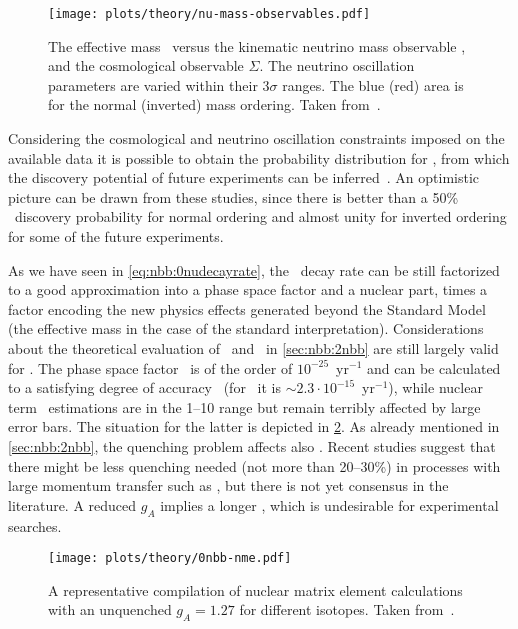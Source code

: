 \begin{figure}
  \centering
  \texttt{[image: plots/theory/nu-mass-observables.pdf]}
  \caption{%
    The effective mass \mbb\ versus the kinematic neutrino mass observable
    \mb, and the cosmological observable $\Sigma$. The neutrino
    oscillation parameters are varied within their $3\sigma$ ranges. The blue
    (red) area is for the normal (inverted) mass ordering. Taken
    from~\cite{Dolinski2019}.
  }\label{fig:nbb:mass-obs}
\end{figure}

Considering the cosmological and neutrino oscillation constraints imposed
on the available data it is possible to obtain the probability distribution
for \mbb, from which the discovery potential of future experiments can be
inferred~\cite{Caldwell2017, Agostini2017a, Ge2017}. An optimistic picture can
be drawn from these studies, since there is better than a 50\% \onbb\ discovery
probability for normal ordering and almost unity for inverted ordering for some
of the future experiments.

As we have seen in \cref{eq:nbb:0nudecayrate}, the \onbb\ decay rate can be
still factorized to a good approximation into a phase space factor and a
nuclear part, times a factor encoding the new physics effects generated beyond
the Standard Model (the effective mass in the case of the standard
interpretation). Considerations about the theoretical evaluation of \psft\ and
\nmet\ in \cref{sec:nbb:2nbb} are still largely valid for \onbb. The phase
space factor \psfz\ is of the order of $10^{-25}$~yr$^{-1}$ and can be
calculated to a satisfying degree of accuracy~\cite{Kotila2012, Stoica2013}
(for \gesix\ it is ${\sim}2.3 \cdot 10^{-15}$~yr$^{-1}$), while nuclear term
\nmez\ estimations are in the 1--10 range but remain terribly affected by large
error bars. The situation for the latter is depicted in \cref{fig:nbb:nme}. As
already mentioned in \cref{sec:nbb:2nbb}, the quenching problem affects also
\onbb. Recent studies suggest that there might be less quenching needed (not
more than 20--30\%) in processes with large momentum transfer such as \onbb,
but there is not yet consensus in the literature. A reduced $g_A$ implies a
longer \thalfzero, which is undesirable for experimental searches.

\begin{figure}
  \centering
  \texttt{[image: plots/theory/0nbb-nme.pdf]}
  \caption{%
    A representative compilation of nuclear matrix element calculations with an unquenched
    $g_A=1.27$ for different isotopes. Taken from~\cite{Yao2020}.
  }\label{fig:nbb:nme}
\end{figure}

